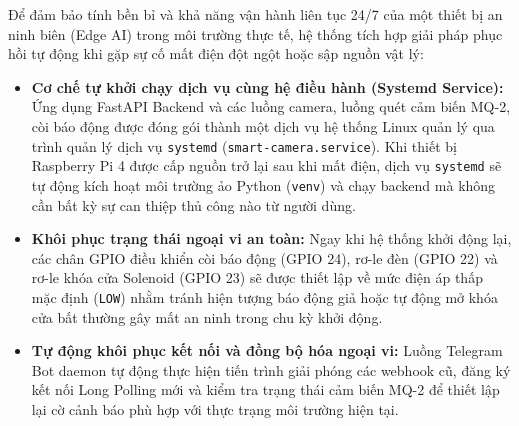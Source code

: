\documentclass[12pt,a4paper]{article}
\begin{document}
Để đảm bảo tính bền bỉ và khả năng vận hành liên tục 24/7 của một thiết bị an ninh biên (Edge AI) trong môi trường thực tế, hệ thống tích hợp giải pháp phục hồi tự động khi gặp sự cố mất điện đột ngột hoặc sập nguồn vật lý:
\begin{itemize}
    \item \textbf{Cơ chế tự khởi chạy dịch vụ cùng hệ điều hành (Systemd Service):} Ứng dụng FastAPI Backend và các luồng camera, luồng quét cảm biến MQ-2, còi báo động được đóng gói thành một dịch vụ hệ thống Linux quản lý qua trình quản lý dịch vụ \texttt{systemd} (\texttt{smart-camera.service}). Khi thiết bị Raspberry Pi 4 được cấp nguồn trở lại sau khi mất điện, dịch vụ \texttt{systemd} sẽ tự động kích hoạt môi trường ảo Python (\texttt{venv}) và chạy backend mà không cần bất kỳ sự can thiệp thủ công nào từ người dùng.
    \item \textbf{Khôi phục trạng thái ngoại vi an toàn:} Ngay khi hệ thống khởi động lại, các chân GPIO điều khiển còi báo động (GPIO 24), rơ-le đèn (GPIO 22) và rơ-le khóa cửa Solenoid (GPIO 23) sẽ được thiết lập về mức điện áp thấp mặc định (\texttt{LOW}) nhằm tránh hiện tượng báo động giả hoặc tự động mở khóa cửa bất thường gây mất an ninh trong chu kỳ khởi động.
    \item \textbf{Tự động khôi phục kết nối và đồng bộ hóa ngoại vi:} Luồng Telegram Bot daemon tự động thực hiện tiến trình giải phóng các webhook cũ, đăng ký kết nối Long Polling mới và kiểm tra trạng thái cảm biến MQ-2 để thiết lập lại cờ cảnh báo phù hợp với thực trạng môi trường hiện tại.
\end{itemize}
\end{document}
